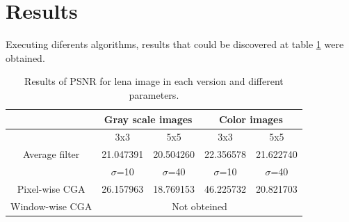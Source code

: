 \documentclass[a4paper,11pt,final]{article}
\begin{document}
\section{Results}
Executing diferents algorithms, results that could be discovered at table \ref{resultados} were obtained.
\begin{table}[!h]
\begin{center}\begin{tabular}{c|c|c|c|c}
&\multicolumn{2}{|c|}{Gray scale images} & \multicolumn{2}{|c}{Color images}\\\hline\hline
& 3x3 & 5x5 & 3x3 & 5x5\\\hline
Average filter & 21.047391 & 20.504260 & 22.356578 & 21.622740\\\hline\hline
& $\sigma$=10 & $\sigma$=40 & $\sigma$=10 & $\sigma$=40\\\hline
Pixel-wise CGA & 26.157963 & 18.769153 & 46.225732 & 20.821703 \\\hline\hline
Window-wise CGA  & \multicolumn{4}{|c}{Not obteined} \\\hline
\end{tabular}
\caption{Results of PSNR for lena image in each version and different parameters. \label{resultados}}
\end{center}
\end{table}
\end{document}
